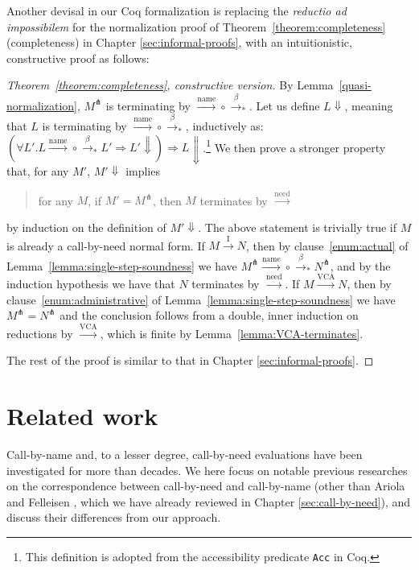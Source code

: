 \documentclass[english]{sumiilab-paper}
\newcommand{\EXPANDLET}[1]{#1^\pitchfork}
\newcommand{\FULLBETA}{\xrightarrow{\beta}}
\newcommand{\CALLBYNAME}{\xrightarrow{\mathrm{name}}}
\newcommand{\CALLBYNEED}{\xrightarrow{\mathrm{need}}}
\newcommand{\CALLBYNEEDI}{\xrightarrow{\mathrm{I}}}
\newcommand{\CALLBYNEEDVCA}{\xrightarrow{\mathrm{VCA}}}
\newcommand{\RTCLOS}[1]{#1_*}
\newcommand{\lemmaname}{Lemma}
\newcommand{\theoremname}{Theorem}
\begin{document}
Another devisal in our Coq formalization is replacing the \emph{reductio ad impossibilem} for the normalization proof of \theoremname~\ref{theorem:completeness} (completeness) in Chapter \ref{sec:informal-proofs}, with an intuitionistic, constructive proof as follows:
\begin{proof}[\theoremname~\ref{theorem:completeness}, constructive version]
	By \lemmaname~\ref{quasi-normalization}, $\EXPANDLET{M}$ is terminating by ${\CALLBYNAME}\circ{\RTCLOS{\FULLBETA}}$.
	Let us define $L \Downarrow$, meaning that $L$ is terminating by ${\CALLBYNAME}\circ{\RTCLOS{\FULLBETA}}$, inductively as:
	$(\forall L'. L {\CALLBYNAME}\circ{\RTCLOS{\FULLBETA}} L' \Rightarrow L' \Downarrow) \Rightarrow L \Downarrow$.\footnote{This definition is adopted from the accessibility predicate \texttt{Acc} in Coq.}
	We then prove a stronger property that, for any $M'$, $M' \Downarrow$ implies
\begin{quote}
for any $M$, if $M' = \EXPANDLET{M}$, then $M$ terminates by $\CALLBYNEED$
\end{quote}
by induction on the definition of $M' \Downarrow$.
The above statement is trivially true if $M$ is already a call-by-need normal form.
If $M \CALLBYNEEDI N$, then by clause~\ref{enum:actual} of \lemmaname~\ref{lemma:single-step-soundness} we have
$\EXPANDLET{M} {\CALLBYNAME}\circ{\RTCLOS{\FULLBETA}} \EXPANDLET{N}$, and by the induction hypothesis we have that $N$ terminates by $\CALLBYNEED$.
If $M \CALLBYNEEDVCA N$, then by clause~\ref{enum:administrative} of \lemmaname~\ref{lemma:single-step-soundness} we have $\EXPANDLET{M} = \EXPANDLET{N}$ and the conclusion follows from a double, inner induction on reductions by $\CALLBYNEEDVCA$, which is finite by \lemmaname~\ref{lemma:VCA-terminates}.

The rest of the proof is similar to that in Chapter \ref{sec:informal-proofs}.
\end{proof}
%
\chapter{Related work}\label{sec:previous-researches}
%
Call-by-name and, to a lesser degree, call-by-need evaluations have been investigated for more than decades.
We here focus on notable previous researches on the correspondence between call-by-need and call-by-name (other than Ariola and Felleisen \cite{Ariola97}, which we have already reviewed in Chapter \ref{sec:call-by-need}), and discuss their differences from our approach.
\end{document}
